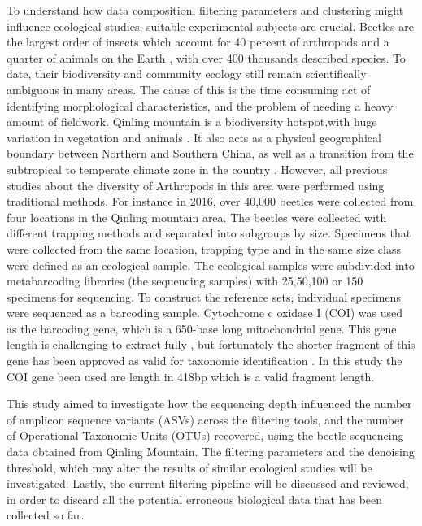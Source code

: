 \documentclass[11pt, a4paper]{article}
\begin{document}
To understand how data composition, filtering parameters and clustering might influence ecological studies, suitable experimental subjects are crucial.  Beetles are the largest order of insects which account for 40 percent of arthropods and a quarter of animals on the Earth \cite{Stork2015}, with over 400 thousands described species\cite{Hunt2007}. To date, their biodiversity and community ecology still remain scientifically ambiguous in many areas. The cause of this is the time consuming act of identifying morphological characteristics, and the problem of needing a heavy amount of fieldwork. 
Qinling mountain is a biodiversity hotspot,with huge variation in vegetation and animals \cite{Zhang2014}. It also acts as a physical geographical boundary between Northern and Southern China, as well as a transition from the subtropical to temperate climate zone in the country \cite{Zhang2017}. However, all previous studies about the diversity of Arthropods in this area were performed using traditional methods\cite{Wei2016}. For instance in 2016, over 40,000 beetles were collected from four locations in the Qinling mountain area. The beetles were collected with different trapping methods and separated into subgroups by size. Specimens that were collected from the same location, trapping type and in the same size class were defined as an ecological sample. The ecological samples were subdivided into metabarcoding libraries (the sequencing samples) with 25,50,100 or 150 specimens for sequencing. To construct the reference sets, individual specimens were sequenced as a barcoding sample. Cytochrome c oxidase I (COI) was used as the barcoding gene, which is a 650-base long mitochondrial gene. This gene length is  challenging to extract fully \cite{Blaxter2004}, but fortunately the shorter fragment of this gene has been approved as valid for taxonomic identification \cite{Hajibabaei2005}. In this study the COI gene been used are length in 418bp which is a valid fragment length. 

This study aimed to investigate how the sequencing depth influenced the number of amplicon sequence variants (ASVs) across the filtering tools, and the number of Operational Taxonomic Units (OTUs) recovered, using the beetle sequencing data obtained from Qinling Mountain. The filtering parameters and the denoising threshold, which may alter the results of similar ecological studies will be investigated. Lastly, the current filtering pipeline will be discussed and reviewed, in order to discard all the potential erroneous biological data that has been collected so far.
\end{document}
